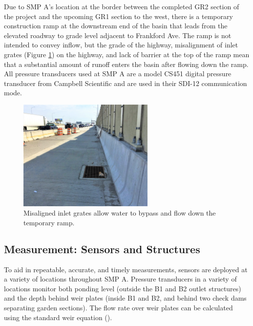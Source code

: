 Due to SMP A's location at the border between the completed GR2 section of the project and the upcoming GR1 section to the west, there is a temporary construction ramp at the downstream end of the basin that leads from the elevated roadway to grade level adjacent to Frankford Ave.
The ramp is not intended to convey inflow, but the grade of the highway, misalignment of inlet grates (Figure \ref{fig:misaligned-catchments}) on the highway, and lack of barrier at the top of the ramp mean that a substantial amount of runoff enters the basin after flowing down the ramp.
All pressure transducers used at SMP A are a model CS451 digital pressure transducer from Campbell Scientific and are used in their SDI-12 communication mode.

\begin{figure}[ht!]
	\centering
	\includegraphics[width=0.6\textwidth]{gfx/chapter-instrumentation/misaligned-catchments.jpg}
	\caption{Misaligned inlet grates allow water to bypass and flow down the temporary ramp.}
	\label{fig:misaligned-catchments}
\end{figure}


\subsection{Measurement: Sensors and Structures}

To aid in repeatable, accurate, and timely measurements, sensors are deployed at a variety of locations throughout SMP A.
Pressure transducers in a variety of locations monitor both ponding level (outside the B1 and B2 outlet structures) and the depth behind weir plates (inside B1 and B2, and behind two check dams separating garden sections).
The flow rate over weir plates can be calculated using the standard weir equation (\cite{USBR2007}).

